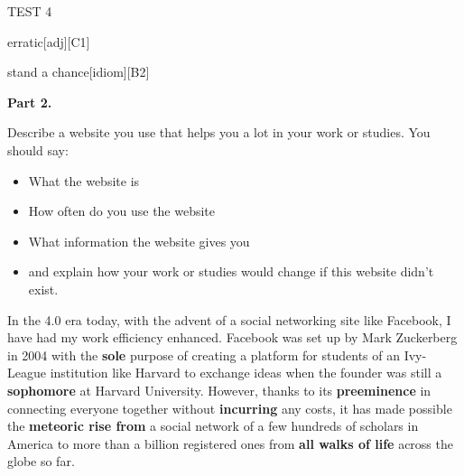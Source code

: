 \begin{glossarymc}[Cambridge 13]
\begin{test}{TEST 4}
\begin{VocabExplain}[Part 1]
            \begin{ExplainCard}{erratic}[adj][C1]
            \end{ExplainCard}

            \begin{ExplainCard}{stand a chance}[idiom][B2]
            \end{ExplainCard}
        \end{VocabExplain}

    \noindent
    \textbf{Part 2.}
    \begin{qa}{Describe a website you use that helps you a lot in your work or studies. You should say:
    \begin{itemize}
        \item What the website is
        \item How often do you use the website
        \item What information the website gives you
        \item and explain how your work or studies would change if this website didn’t exist.
    \end{itemize}}

    In the 4.0 era today, with the advent of a social networking site like Facebook, I have had my work efficiency enhanced. Facebook was set up by Mark Zuckerberg in 2004 with the \textbf{sole} purpose of creating a platform for students of an Ivy-League institution like Harvard to exchange ideas when the founder was still a \textbf{sophomore} at Harvard University. However, thanks to its \textbf{preeminence} in connecting everyone together without \textbf{incurring} any costs, it has made possible the \textbf{meteoric rise from} a social network of a few hundreds of scholars in America to more than a billion registered ones from \textbf{all walks of life} across the globe so far. 


\end{qa}
\end{test}
\end{glossarymc}
